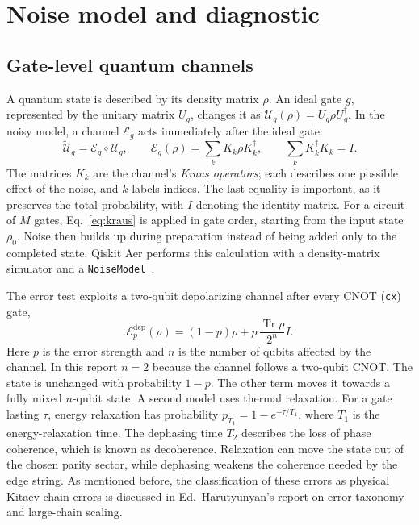 %

\section{Noise model and diagnostic}
\label{sec:theory}

\subsection{Gate-level quantum channels}

A quantum state is described by its density matrix $\rho$.  An ideal gate
$g$, represented by the unitary matrix $U_g$, changes it as
$\mathcal U_g(\rho)=U_g\rho U_g^\dagger$.  In the noisy model, a channel
$\mathcal E_g$ acts immediately after the ideal gate:
\begin{equation}
  \widetilde{\mathcal U}_g=\mathcal E_g\circ\mathcal U_g,
  \qquad
  \mathcal E_g(\rho)=\sum_k K_k\rho K_k^\dagger,
  \qquad
  \sum_k K_k^\dagger K_k=I .
  \label{eq:kraus}
\end{equation}
The matrices $K_k$ are the channel's \emph{Kraus operators}; each describes
one possible effect of the noise, and $k$ labels indices.  The last equality is important, as it
preserves the total probability, with $I$ denoting the identity matrix.  For a circuit
of $M$ gates, Eq.~\eqref{eq:kraus} is applied in gate order, starting from the
input state $\rho_0$.  Noise then builds up during preparation instead of being
added only to the completed state.  Qiskit Aer performs this calculation with a
density-matrix simulator and a \texttt{NoiseModel}~\cite{qiskit2024}.

The error test exploits a two-qubit depolarizing channel after
every CNOT (\texttt{cx}) gate,
\begin{equation}
  \mathcal E^{\mathrm{dep}}_p(\rho)
  =(1-p)\rho+p\,\frac{\operatorname{Tr}\rho}{2^n}I .
  \label{eq:depol}
\end{equation}
Here $p$ is the error strength and $n$ is the number of qubits affected by
the channel.  In this report $n=2$ because the channel follows a two-qubit CNOT.
The state is unchanged with probability $1-p$.  The other term moves it towards
a fully mixed $n$-qubit state.  A second model uses thermal relaxation.  For a
gate lasting $\tau$, energy relaxation has probability
$p_{T_1}=1-e^{-\tau/T_1}$, where $T_1$ is the energy-relaxation time.  The
dephasing time $T_2$ describes the loss of phase coherence, which is known as decoherence.  Relaxation can move the
state out of the chosen parity sector, while dephasing weakens the coherence
needed by the edge string.  As mentioned before, the classification of these errors as physical Kitaev-chain errors
is discussed in Ed.\ Harutyunyan's report on error taxonomy and large-chain
scaling.

